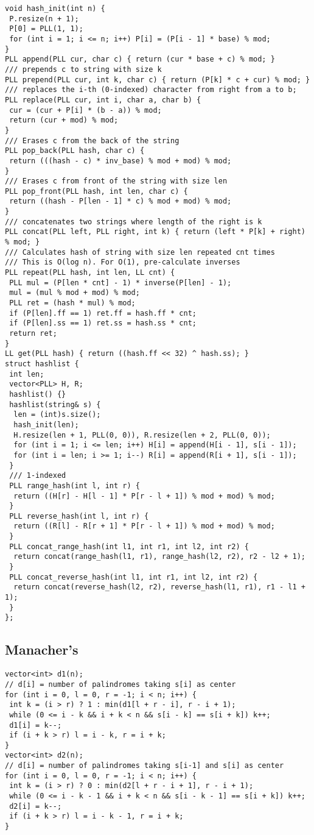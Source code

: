\documentclass[a4paper,11pt,oneside]{article}
\begin{document}
\begin{multicols*}{\COLS}
\begin{lstlisting}
void hash_init(int n) {
 P.resize(n + 1);
 P[0] = PLL(1, 1);
 for (int i = 1; i <= n; i++) P[i] = (P[i - 1] * base) % mod;
}
PLL append(PLL cur, char c) { return (cur * base + c) % mod; }
/// prepends c to string with size k
PLL prepend(PLL cur, int k, char c) { return (P[k] * c + cur) % mod; }
/// replaces the i-th (0-indexed) character from right from a to b;
PLL replace(PLL cur, int i, char a, char b) {
 cur = (cur + P[i] * (b - a)) % mod;
 return (cur + mod) % mod;
}
/// Erases c from the back of the string
PLL pop_back(PLL hash, char c) {
 return (((hash - c) * inv_base) % mod + mod) % mod;
}
/// Erases c from front of the string with size len
PLL pop_front(PLL hash, int len, char c) {
 return ((hash - P[len - 1] * c) % mod + mod) % mod;
}
/// concatenates two strings where length of the right is k
PLL concat(PLL left, PLL right, int k) { return (left * P[k] + right) % mod; }
/// Calculates hash of string with size len repeated cnt times
/// This is O(log n). For O(1), pre-calculate inverses
PLL repeat(PLL hash, int len, LL cnt) {
 PLL mul = (P[len * cnt] - 1) * inverse(P[len] - 1);
 mul = (mul % mod + mod) % mod;
 PLL ret = (hash * mul) % mod;
 if (P[len].ff == 1) ret.ff = hash.ff * cnt;
 if (P[len].ss == 1) ret.ss = hash.ss * cnt;
 return ret;
}
LL get(PLL hash) { return ((hash.ff << 32) ^ hash.ss); }
struct hashlist {
 int len;
 vector<PLL> H, R;
 hashlist() {}
 hashlist(string& s) {
  len = (int)s.size();
  hash_init(len);
  H.resize(len + 1, PLL(0, 0)), R.resize(len + 2, PLL(0, 0));
  for (int i = 1; i <= len; i++) H[i] = append(H[i - 1], s[i - 1]);
  for (int i = len; i >= 1; i--) R[i] = append(R[i + 1], s[i - 1]);
 }
 /// 1-indexed
 PLL range_hash(int l, int r) {
  return ((H[r] - H[l - 1] * P[r - l + 1]) % mod + mod) % mod;
 }
 PLL reverse_hash(int l, int r) {
  return ((R[l] - R[r + 1] * P[r - l + 1]) % mod + mod) % mod;
 }
 PLL concat_range_hash(int l1, int r1, int l2, int r2) {
  return concat(range_hash(l1, r1), range_hash(l2, r2), r2 - l2 + 1);
 }
 PLL concat_reverse_hash(int l1, int r1, int l2, int r2) {
  return concat(reverse_hash(l2, r2), reverse_hash(l1, r1), r1 - l1 + 1);
 }
};
\end{lstlisting}
\subsection{Manacher's}
\begin{lstlisting}
vector<int> d1(n);
// d[i] = number of palindromes taking s[i] as center
for (int i = 0, l = 0, r = -1; i < n; i++) {
 int k = (i > r) ? 1 : min(d1[l + r - i], r - i + 1);
 while (0 <= i - k && i + k < n && s[i - k] == s[i + k]) k++;
 d1[i] = k--;
 if (i + k > r) l = i - k, r = i + k;
}
vector<int> d2(n);
// d[i] = number of palindromes taking s[i-1] and s[i] as center
for (int i = 0, l = 0, r = -1; i < n; i++) {
 int k = (i > r) ? 0 : min(d2[l + r - i + 1], r - i + 1);
 while (0 <= i - k - 1 && i + k < n && s[i - k - 1] == s[i + k]) k++;
 d2[i] = k--;
 if (i + k > r) l = i - k - 1, r = i + k;
}
\end{lstlisting}

\end{multicols*}
\end{document}
